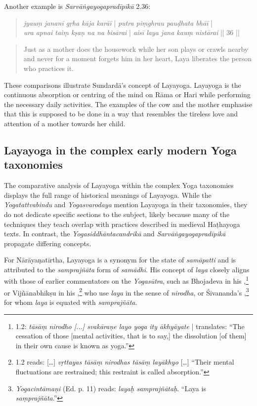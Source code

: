 Another example is \textit{Sarvāṅgayogapradīpikā} 2.36:

\begin{quote}
\textit{jyauṃ jananī gṛha kāja karāī} | \textit{putra piṃghrau pauḍhata bhāī} |\\
\textit{ura apnai taiṃ kṣaṇ na na bisārai} | \textit{aisī laya jana kauṃ nistārai} || 36 ||
\end{quote}
\begin{quote}
Just as a mother does the housework while her son plays or crawls nearby and never for a moment forgets him in her heart, Laya liberates the person who practices it.
\end{quote}

These comparisons illustrate Sundardā's concept of Layayoga. Layayoga is the continuous absorption or centring of the mind on Rāma or Hari while performing the necessary daily activities. The examples of the cow and the mother emphasise that this is supposed to be done in a way that resembles the tireless love and attention of a mother towards her child.

\subsection{Layayoga in the complex early modern Yoga taxonomies}

The comparative analysis of Layayoga within the complex Yoga taxonomies displays the full range of historical meanings of Layayoga. While the \textit{Yogatattvabindu} and \textit{Yogasvarodaya} mention Layayoga in their taxonomies, they do not dedicate specific sections to the subject, likely because many of the techniques they teach overlap with practices described in medieval Haṭhayoga texts. In contrast, the \textit{Yogasiddhāntacandrikā} and \textit{Sarvāṅgayogapradīpikā} propagate differing concepts.

For Nārāyaṇatīrtha, Layayoga is a synonym for the state of \textit{samāpatti} and is attributed to the \textit{samprajñāta} form of \textit{samādhi}. His concept of \textit{laya} closely aligns with those of earlier commentators on the \textit{Yogasūtra}, such as Bhojadeva in his ,\footnote{ 1.2: \textit{tāsāṃ nirodho [...] svakāraṇe layo yoga ity ākhyāyate} | \citeauthor{amaraugha2024} translates: ``The cessation of those [mental activities, that is to say,] the dissolution [of them] in their own cause is known as yoga.''} or Vijñānabhikṣu in his ,\footnote{ 1.2 reads: [\ldots] \textit{vṛttayas tāsāṃ nirodhas tāsāṃ layākhyo} [\ldots] ``Their mental fluctuations are restrained; this restraint is called absorption.''} who use \textit{laya} in the sense of \textit{nirodha}, or Śivananda's ,\footnote{\emph{Yogacintāmaṇi} (Ed. p. 11) reads: \textit{layaḥ samprajñātaḥ}. ``Laya is \textit{saṃprajñāta}.''} for whom \textit{laya} is equated with \textit{samprajñāta}.

